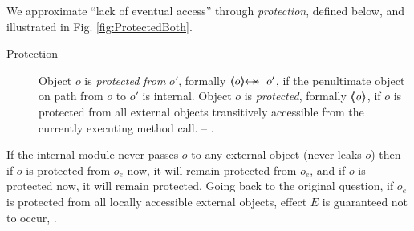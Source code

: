 We approximate ``lack of eventual access'' through \emph{protection}, defined below, and illustrated in %
Fig.  \ref{fig:ProtectedBoth}.  %

 \begin{description}
\item[Protection] Object $o$ is \emph{protected  from} $o'$, formally $\protectedFrom {o} {o'}$,  
 if the penultimate object on  path from $o$ to $o'$  is internal.
Object $o$ is \emph{protected}, formally ${\langle\!\!\langle \mbox{\normalfont{\texttt{\it{o}}}} \rangle\!\!\rangle}$, if $o$ is protected from all external objects transitively accessible from the currently executing method call. %
-- \cf {}. %

 \end{description}
 


If the  internal module  never passes $o$ to any external object (\ie never leaks $o$) then if $o$ is protected from $o_e$ now, it will remain protected from $o_e$,
and if $o$ is protected now, it will remain protected.
Going back to the original question, if $o_e$ is protected from all locally accessible external objects, effect  $E$ is guaranteed not to occur, .

